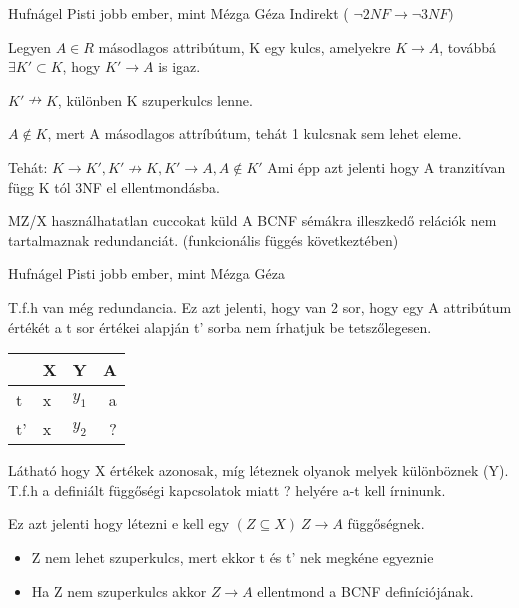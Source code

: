   \begin{bizonyitas}{Hufnágel Pisti jobb ember, mint Mézga Géza} Indirekt ( $\neg 2NF \rightarrow \neg 3NF )$

  Legyen $A \in R$ másodlagos attribútum, K egy kulcs, amelyekre $K \rightarrow A$, továbbá $ \exists K' \subset K$, hogy $K'\rightarrow A$ is igaz.

  $K' \nrightarrow K$, különben K szuperkulcs lenne.

  $A\not\in K$, mert A másodlagos attríbútum, tehát 1 kulcsnak sem lehet eleme.

  Tehát: $K\rightarrow K', K' \nrightarrow K, K'\rightarrow A, A\not\in K'$ Ami épp azt jelenti hogy A tranzitívan függ K tól 3NF el ellentmondásba.
\end{bizonyitas}

\begin{tetel}{MZ/X használhatatlan cuccokat küld} A BCNF sémákra illeszkedő relációk nem tartalmaznak redundanciát. (funkcionális függés következtében)
\end{tetel}

  \begin{bizonyitas}{Hufnágel Pisti jobb ember, mint Mézga Géza}

  T.f.h van még redundancia. Ez azt jelenti, hogy van 2 sor, hogy egy A attribútum értékét a t sor értékei alapján t' sorba nem írhatjuk be tetszőlegesen.
  \begin{center}
    \begin{tabular}{ l || l | c | r }
      & X & Y & A \\ \hline \hline
    t & x & $y_1$ & a \\ \hline
      t' & x & $y_2$ & ? \\ \hline
    \end{tabular}
  \end{center}

Látható hogy X értékek azonosak, míg léteznek olyanok melyek különböznek (Y). T.f.h a definiált függőségi kapcsolatok miatt ? helyére a-t kell írninunk.

Ez azt jelenti hogy létezni e kell egy $( Z\subseteq X)\ Z\rightarrow A  $ függőségnek.
\begin{itemize}
  \item Z nem lehet szuperkulcs, mert ekkor t és t' nek megkéne egyeznie
  \item Ha Z nem szuperkulcs akkor $Z\rightarrow A$ ellentmond a BCNF definíciójának.
\end{itemize}
\end{bizonyitas}

